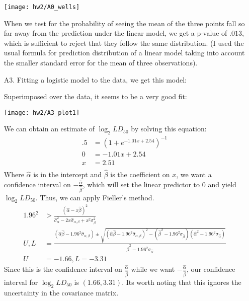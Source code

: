 \documentclass[11pt]{article}
\theoremstyle{definition}
\begin{document}
\begin{itemize}
\begin{center}
            \texttt{[image: hw2/A0\_wells]} 
        \end{center}
        When we test for the probability of seeing the mean of the three points fall so far away from the prediction under the linear model, we get a p-value of $.013$, which is sufficient to reject that they follow the same distribution. (I used the usual formula for prediction distribution of a linear model taking into account the smaller standard error for the mean of three observations).
    \item[A3.]
        Fitting a logistic model to the data, we get this model:
        \FloatBarrier
        
        \FloatBarrier
        Superimposed over the data, it seems to be a very good fit:
        \begin{center}
            \texttt{[image: hw2/A3\_plot1]} 
        \end{center}
        We can obtain an estimate of $\log_2LD_{50}$ by solving this equation:
        \begin{align*}
            .5 &= (1+e^{-1.01x+2.54})^{-1} \\
            0  &= -1.01x+2.54 \\
            x  &= 2.51 \\
        \end{align*}
        Where $\hat\alpha$ is in the intercept and $\hat\beta$ is the coefficient on $x$, we want a confidence interval on $-\frac{\hat\alpha}{\hat\beta}$, which will set the linear predictor to $0$ and yield $\log_2LD_{50}$. Thus, we can apply Fieller's method.
        \begin{align*} 
            1.96^2 &> \frac{(\hat\alpha - x\hat\beta)^2}{\hat\sigma_\alpha^2 - 2x\hat\sigma_{\alpha,\beta} + x^2\sigma_\beta^2} \\
            U,L &= \frac{(\hat\alpha\hat\beta - 1.96^2\hat\sigma_{\alpha,\beta}) \pm \sqrt{(\hat\alpha\hat\beta - 1.96^2\hat\sigma_{\alpha,\beta})^2 - (\hat\beta^2 - 1.96^2\sigma_{\hat\beta})(\hat\alpha^2 - 1.96^2\sigma_{\hat\alpha})}}{\hat\beta^2 - 1.96^2 \sigma_{\hat\alpha}} \\
            U&=-1.66, L=-3.31
        \end{align*}
        Since this is the confidence interval on $\frac{\hat\alpha}{\hat\beta}$ while we want $-\frac{\hat\alpha}{\hat\beta}$, our confidence interval for $\log_2LD_{50}$ is $(1.66,3.31)$. Its worth noting that this ignores the uncertainty in the covariance matrix. \\

\end{itemize}
\end{document}
